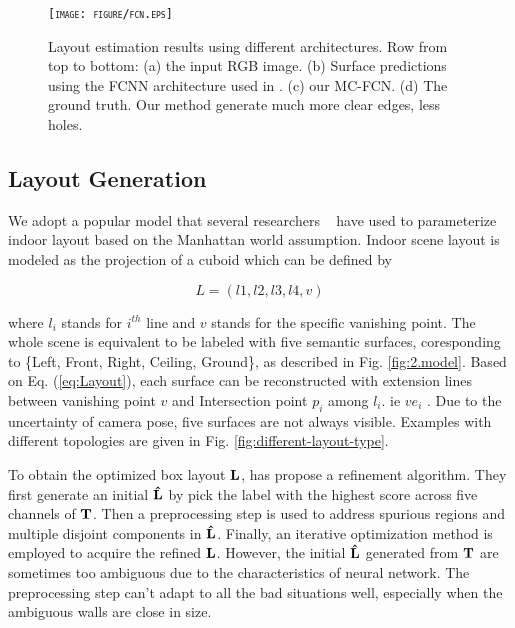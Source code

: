 \begin{figure}[!ht]
	\centering 
	\textsc{\texttt{[image: figure/fcn.eps]}}
	\caption{Layout estimation results using different architectures. Row from top to bottom: (a) the input RGB image. (b) Surface predictions using the FCNN architecture used in \cite{dasgupta2016delay,ren2016coarse}. (c) our MC-FCN. (d) The ground truth. Our method generate much more clear edges, less holes.}
	\label{fig:fcn-comparison}
\end{figure}


\subsection{Layout Generation}
\label{sec:optimization}
We adopt a popular model that several researchers ~\cite{hedau2009recovering, wang2013discriminative, dasgupta2016delay, ren2016coarse} have used to parameterize indoor layout based on the Manhattan world assumption. 
Indoor scene layout is modeled as the projection of a cuboid which can be defined by 

\begin{equation}
	\label{eq:Layout}
	L = (l1, l2, l3, l4, v)
\end{equation}

where $l_{i}$ stands for $i^{th}$ line and $v$ stands for the specific vanishing point. The whole scene is equivalent to be labeled with five semantic surfaces, coresponding to \{Left, Front, Right, Ceiling, Ground\}, as described in Fig. \ref{fig:2.model}. Based on Eq. (\ref{eq:Layout}), each surface can be reconstructed with extension lines between vanishing point $v$ and Intersection point $p_i$ among $l_{i}$. ie $ve_i$ . Due to the uncertainty of camera pose, five surfaces are not always visible. Examples with different topologies are given in Fig. \ref{fig:different-layout-type}.


To obtain the optimized box layout $\mathbf{L}$, \cite{dasgupta2016delay} has propose a refinement algorithm. They first generate an initial $\mathbf{\hat{L}}$ by pick the label with the highest score across five channels of $\mathbf{T}$. Then a preprocessing step is used to address spurious regions and multiple disjoint components in $\mathbf{\hat{L}}$. Finally, an iterative optimization method is employed to acquire the refined $\mathbf{L}$. However, the initial $\mathbf{\hat{L}}$ generated from $\mathbf{T}$ are sometimes too ambiguous due to the characteristics of neural network. The preprocessing step can't adapt to all the bad situations well, especially when the ambiguous walls are close in size. 


